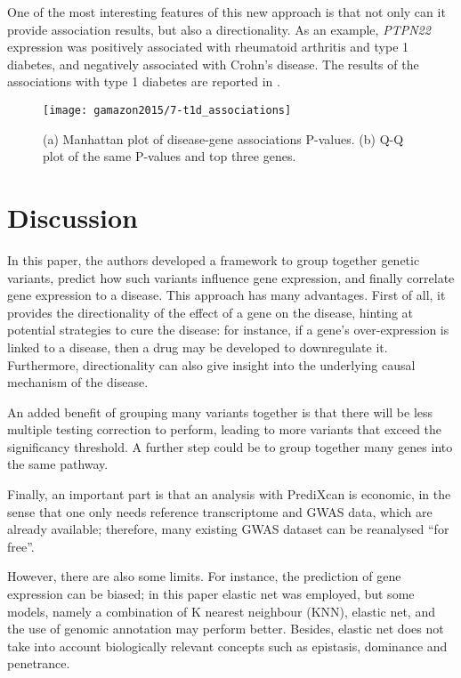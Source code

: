 \documentclass[../main.tex]{subfiles}
\begin{document}
One of the most interesting features of this new approach is that not 
only can it provide association results, but also a directionality. As 
an example, \textit{PTPN22} expression was positively associated with 
rheumatoid arthritis and type 1 diabetes, and negatively associated with 
Crohn's disease. The results of the associations with type 1 diabetes 
are reported in .

\begin{figure}
	\texttt{[image: gamazon2015/7-t1d\_associations]}
	\caption{(a) Manhattan plot of disease-gene associations P-values. 
(b) Q-Q plot of the same P-values and top three genes.}
\end{figure}

\section{Discussion}

In this paper, the authors developed a framework to group together 
genetic variants, predict how such variants influence gene expression, 
and finally correlate gene expression to a disease. This approach has 
many advantages. First of all, it provides the directionality of the 
effect of a gene on the disease, hinting at potential strategies to cure 
the disease: for instance, if a gene's over-expression is linked to a 
disease, then a drug may be developed to downregulate it. Furthermore, 
directionality can also give insight into the underlying causal 
mechanism of the disease.

An added benefit of grouping many variants together is that there will 
be less multiple testing correction to perform, leading to more variants 
that exceed the significancy threshold. A further step could be to group 
together many genes into the same pathway.

Finally, an important part is that an analysis with PrediXcan is 
economic, in the sense that one only needs reference transcriptome and 
GWAS data, which are already available; therefore, many existing GWAS 
dataset can be reanalysed \enquote{for free}.

However, there are also some limits. For instance, the prediction of 
gene expression can be biased; in this paper elastic net was employed, 
but some models, namely a combination of K nearest neighbour (KNN), 
elastic net, and the use of genomic annotation may perform better. 
Besides, elastic net does not take into account biologically relevant 
concepts such as epistasis, dominance and penetrance.
\end{document}
